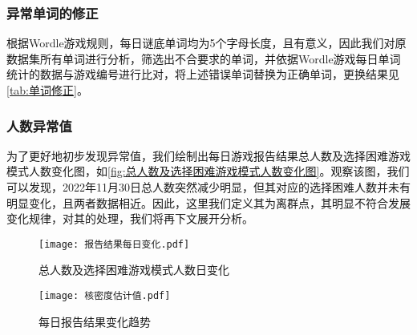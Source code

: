 \documentclass{MathModeling}
\begin{document}
	\subsubsection{异常单词的修正}
	根据Wordle游戏规则，每日谜底单词均为5个字母长度，且有意义，因此我们对原数据集所有单词进行分析，筛选出不合要求的单词，并依据Wordle游戏每日单词统计的数据与游戏编号进行比对，将上述错误单词替换为正确单词，更换结果见\textcolor{blue}{\cref{tab:单词修正}}。
\begin{table}[H]
	\centering
	\caption{单词修正}
	\label{tab:单词修正}
\end{table}
  
	\subsubsection{人数异常值}
	为了更好地初步发现异常值，我们绘制出每日游戏报告结果总人数及选择困难游戏模式人数变化图，如\textcolor{blue}{\cref{fig:总人数及选择困难游戏模式人数变化图}}。观察该图，我们可以发现，2022年11月30日总人数突然减少明显，但其对应的选择困难人数并未有明显变化，且两者数据相近。因此，这里我们定义其为离群点，其明显不符合发展变化规律，对其的处理，我们将再下文展开分析。

	\begin{figure}[H]
		\centering
		\begin{minipage}{0.48\linewidth}
			\centering
			\texttt{[image: 报告结果每日变化.pdf]}
			\caption{总人数及选择困难游戏模式人数日变化}
			\label{fig:总人数及选择困难游戏模式人数变化图}
		\end{minipage}
		\begin{minipage}{0.48\linewidth}
			\centering
			\texttt{[image: 核密度估计值.pdf]}
			\caption{每日报告结果变化趋势}
			\label{fig:每日报告结果变化趋势}
		\end{minipage}
	\end{figure}
\end{document}
